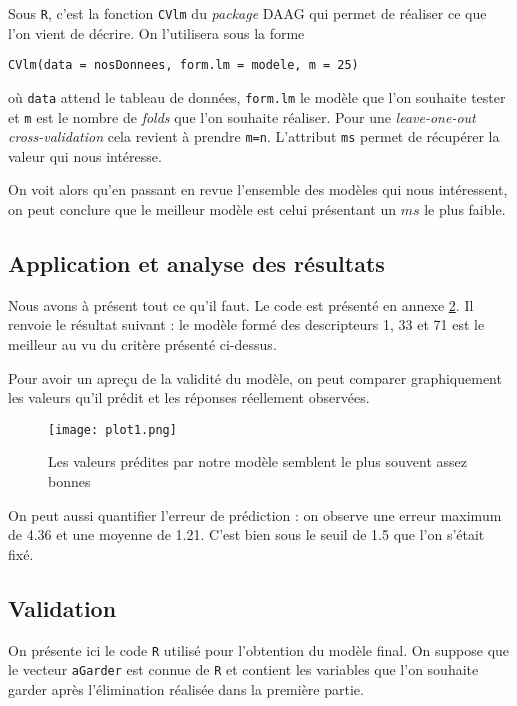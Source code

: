 Sous \verb|R|, c'est la fonction \verb|CVlm| du \emph{package} DAAG qui permet de réaliser ce que l'on vient de décrire. On l'utilisera sous la forme 
\begin{center}
\verb|CVlm(data = nosDonnees, form.lm = modele, m = 25)|
\end{center}
où \verb|data| attend le tableau de données, \verb|form.lm| le modèle que l'on souhaite tester et \verb|m| est le nombre de \emph{folds} que l'on souhaite réaliser.
Pour une \emph{leave-one-out cross-validation} cela revient à prendre \verb|m=n|. L'attribut \verb|ms| permet de récupérer la valeur qui nous intéresse.    

On voit alors qu'en passant en revue l'ensemble des modèles qui nous intéressent, on peut conclure que le meilleur modèle est celui présentant un $ms$ le plus faible.


\section{Application et analyse des résultats}

Nous avons à présent tout ce qu'il faut. Le code est présenté en annexe \ref{CV}. Il renvoie le résultat suivant : le modèle formé des descripteurs 1, 33 et 71 est le meilleur au vu du critère présenté ci-dessus. 

Pour avoir un apreçu de la validité du modèle, on peut comparer graphiquement les valeurs qu'il prédit et les réponses réellement observées.

 \begin{figure}[!ht]
	\centering
     	\texttt{[image: plot1.png]}

	\caption{Les valeurs prédites par notre modèle semblent le plus souvent assez bonnes}
\end{figure}

On peut aussi quantifier l'erreur de prédiction : on observe une erreur maximum de 4.36 et une moyenne de 1.21. C'est bien sous le seuil de 1.5 que l'on s'était fixé.
 
\begin{appendix}
 \chapter{Validation}
 \label{CV}
 On présente ici le code \verb|R| utilisé pour l'obtention du modèle final. On suppose que le vecteur \verb|aGarder| est connue de \verb|R| et contient les variables que l'on souhaite garder après l'élimination réalisée dans la première partie. 
 
 \lstset{language=Scilab, frame=single, xrightmargin =0cm , xleftmargin =0 cm}
  
  \end{appendix}





